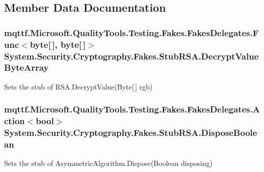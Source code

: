 \subsection{Member Data Documentation}
\hypertarget{class_system_1_1_security_1_1_cryptography_1_1_fakes_1_1_stub_r_s_a_aecd108e51d6c85bfdf0897bc52e520f3}{
\subsubsection[{Decrypt\-Value\-Byte\-Array}]{\setlength{\rightskip}{0pt plus 5cm}mqttf.\-Microsoft.\-Quality\-Tools.\-Testing.\-Fakes.\-Fakes\-Delegates.\-Func$<$byte\mbox{[}$\,$\mbox{]}, byte\mbox{[}$\,$\mbox{]}$>$ System.\-Security.\-Cryptography.\-Fakes.\-Stub\-R\-S\-A.\-Decrypt\-Value\-Byte\-Array}}\label{class_system_1_1_security_1_1_cryptography_1_1_fakes_1_1_stub_r_s_a_aecd108e51d6c85bfdf0897bc52e520f3}


Sets the stub of R\-S\-A.\-Decrypt\-Value(\-Byte\mbox{[}$\,$\mbox{]} rgb)

\hypertarget{class_system_1_1_security_1_1_cryptography_1_1_fakes_1_1_stub_r_s_a_acccf1c7e476238f7e18c6600a735a727}{
\subsubsection[{Dispose\-Boolean}]{\setlength{\rightskip}{0pt plus 5cm}mqttf.\-Microsoft.\-Quality\-Tools.\-Testing.\-Fakes.\-Fakes\-Delegates.\-Action$<$bool$>$ System.\-Security.\-Cryptography.\-Fakes.\-Stub\-R\-S\-A.\-Dispose\-Boolean}}\label{class_system_1_1_security_1_1_cryptography_1_1_fakes_1_1_stub_r_s_a_acccf1c7e476238f7e18c6600a735a727}


Sets the stub of Asymmetric\-Algorithm.\-Dispose(\-Boolean disposing)

